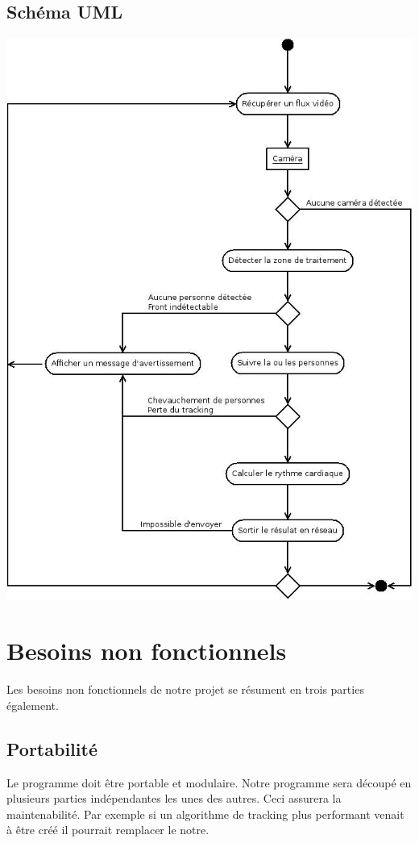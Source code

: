 \documentclass[12pt,a4paper]{article}
\begin{document}
\subsection{Schéma UML}
\includegraphics[scale=0.5]{uml.jpeg}
\newpage

\section{Besoins non fonctionnels}

Les besoins non fonctionnels de notre projet se résument en trois parties également.
\subsection{Portabilité}
Le programme doit être portable et modulaire. Notre programme sera découpé en plusieurs parties indépendantes les unes des autres. Ceci assurera la maintenabilité. Par exemple si un algorithme de tracking plus performant venait à être créé il pourrait remplacer le notre.
\end{document}
